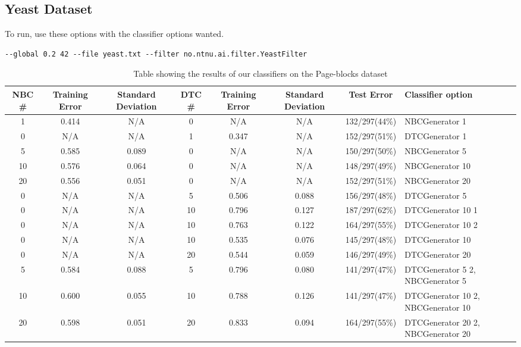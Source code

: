 \subsection{Yeast Dataset}\label{yeast}


To run, use these options with the classifier options wanted.

\begin{lstlisting}[label=lst:yeast, caption=Yeast dataset general 
options]
--global 0.2 42 --file yeast.txt --filter no.ntnu.ai.filter.YeastFilter
\end{lstlisting}

\begin{landscape}
\begin{table}
\begin{tabular}{|c|c|c||c|c|c||c||p{5cm}|}
\hline
NBC \# & Training Error & Standard Deviation & DTC \# & Training Error
& Standard Deviation & Test Error & Classifier option \\ \hline
1 & 0.414 & N/A & 0 & N/A & N/A & 132/297(44\%) & NBCGenerator 1 \\ \hline
0 & N/A & N/A & 1 & 0.347 & N/A & 152/297(51\%) & DTCGenerator 1 \\ \hline
5 & 0.585 & 0.089 & 0 & N/A & N/A & 150/297(50\%) & NBCGenerator 5 \\ \hline
10 & 0.576 & 0.064 & 0 & N/A & N/A & 148/297(49\%) & NBCGenerator 10 \\ \hline
20 & 0.556 & 0.051 & 0 & N/A & N/A & 152/297(51\%) & NBCGenerator 20 \\ \hline
0 & N/A & N/A & 5 & 0.506 & 0.088 & 156/297(48\%) & DTCGenerator 5 \\ \hline
0 & N/A & N/A & 10 & 0.796 & 0.127 & 187/297(62\%) & DTCGenerator 10 1 \\ 
\hline
0 & N/A & N/A & 10 & 0.763 & 0.122 & 164/297(55\%) & DTCGenerator 10 2 \\ 
\hline
0 & N/A & N/A & 10 & 0.535 & 0.076 & 145/297(48\%) & DTCGenerator 10 \\ \hline
0 & N/A & N/A & 20 & 0.544 & 0.059 & 146/297(49\%) & DTCGenerator 20 \\ \hline
5 & 0.584 & 0.088 & 5 & 0.796 & 0.080 & 141/297(47\%) & DTCGenerator 5 2, 
\newline NBCGenerator 5 \\ \hline
10 & 0.600 & 0.055 & 10 & 0.788 & 0.126 & 141/297(47\%) & DTCGenerator 10 2, 
\newline NBCGenerator 10 \\ \hline
20 & 0.598 & 0.051 & 20 & 0.833 & 0.094 & 164/297(55\%) & DTCGenerator 20 2, 
\newline NBCGenerator 20 \\ \hline
\hline
\end{tabular}
\label{tab:pblocks}
\caption{Table showing the results of our classifiers on the Page-blocks 
dataset}
\end{table}
\end{landscape}
